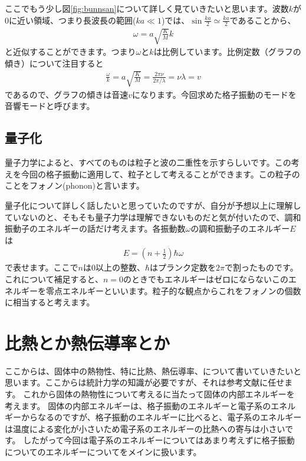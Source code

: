 \documentclass[10pt,b5paper,papersize,dvipdfmx]{jsbook}
\begin{document}
ここでもう少し図\ref{fig:bunnsan}について詳しく見ていきたいと思います。波数$k$が$0$に近い領域、つまり長波長の範囲($ka \ll 1$)では、$\sin \frac{ka}{2} \simeq \frac{ka}{2}$であることから、
\begin{align}
  \omega = a \sqrt{\frac{K}{M}}k
\end{align}
と近似することができます。つまり$\omega$と$k$は比例しています。比例定数（グラフの傾き）について注目すると
\begin{align}
  \frac{\omega}{k} =a \sqrt{\frac{K}{M}}= \frac{2\pi\nu}{2\pi/\lambda} = \nu \lambda = v
\end{align}
であるので、グラフの傾きは音速$v$になります。今回求めた格子振動のモードを音響モードと呼びます。

\subsection{量子化}
量子力学によると、すべてのものは粒子と波の二重性を示すらしいです。この考えを今回の格子振動に適用して、粒子として考えることができます。この粒子のことをフォノン(phonon)と言います。\par
量子化について詳しく話したいと思っていたのですが、自分が予想以上に理解していないのと、そもそも量子力学は理解できないものだと気が付いたので、調和振動子のエネルギーの話だけ考えます。各振動数$\omega$の調和振動子のエネルギー$E$は
\begin{align}
  E = \left(n + \frac{1}{2}\right)\hbar \omega
\end{align}
で表せます。ここで$n$は0以上の整数、$\hbar$はプランク定数を$2\pi$で割ったものです。これについて補足すると、$n = 0$のときでもエネルギーはゼロにならないこのエネルギーを零点エネルギーといいます。粒子的な観点からこれをフォノンの個数に相当すると考えます。


\section{比熱とか熱伝導率とか}
ここからは、固体中の熱物性、特に比熱、熱伝導率、について書いていきたいと思います。ここからは統計力学の知識が必要ですが、それは参考文献に任せます。
これから固体の熱物性について考えるに当たって固体の内部エネルギーを考えます。
固体の内部エネルギーは、格子振動のエネルギーと電子系のエネルギーからなるのですが、格子振動のエネルギーに比べると、電子系のエネルギーは温度による変化が小さいため電子系のエネルギーの比熱への寄与は小さいです。
したがって今回は電子系のエネルギーについてはあまり考えずに格子振動についてのエネルギーについてをメインに扱います。
\end{document}
